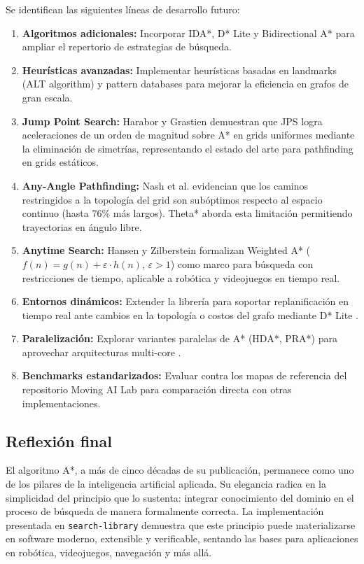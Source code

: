 Se identifican las siguientes líneas de desarrollo futuro:

\begin{enumerate}
    \item \textbf{Algoritmos adicionales:} Incorporar IDA*, D* Lite y Bidirectional A* para ampliar el repertorio de estrategias de búsqueda.
    
    \item \textbf{Heurísticas avanzadas:} Implementar heurísticas basadas en landmarks (ALT algorithm) y pattern databases para mejorar la eficiencia en grafos de gran escala.
    
    \item \textbf{Jump Point Search:} Harabor y Grastien \cite{harabor2011online} demuestran que JPS logra aceleraciones de un orden de magnitud sobre A* en grids uniformes mediante la eliminación de simetrías, representando el estado del arte para pathfinding en grids estáticos.
    
    \item \textbf{Any-Angle Pathfinding:} Nash et al. \cite{nash2010theta} evidencian que los caminos restringidos a la topología del grid son subóptimos respecto al espacio continuo (hasta 76\% más largos). Theta* aborda esta limitación permitiendo trayectorias en ángulo libre.
    
    \item \textbf{Anytime Search:} Hansen y Zilberstein \cite{hansen2001anytime} formalizan Weighted A* ($f(n) = g(n) + \varepsilon \cdot h(n)$, $\varepsilon > 1$) como marco para búsqueda con restricciones de tiempo, aplicable a robótica y videojuegos en tiempo real.
    
    \item \textbf{Entornos dinámicos:} Extender la librería para soportar replanificación en tiempo real ante cambios en la topología o costos del grafo mediante D* Lite \cite{koenig2002d}.
    
    \item \textbf{Paralelización:} Explorar variantes paralelas de A* (HDA*, PRA*) para aprovechar arquitecturas multi-core \cite{fukunaga2017survey}.
    
    \item \textbf{Benchmarks estandarizados:} Evaluar contra los mapas de referencia del repositorio Moving AI Lab \cite{sturtevant2012benchmarks} para comparación directa con otras implementaciones.
\end{enumerate}

\subsection{Reflexión final}

El algoritmo A*, a más de cinco décadas de su publicación, permanece como uno de los pilares de la inteligencia artificial aplicada. Su elegancia radica en la simplicidad del principio que lo sustenta: integrar conocimiento del dominio en el proceso de búsqueda de manera formalmente correcta. La implementación presentada en \texttt{search-library} demuestra que este principio puede materializarse en software moderno, extensible y verificable, sentando las bases para aplicaciones en robótica, videojuegos, navegación y más allá.
